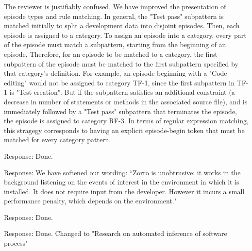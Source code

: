 \documentclass[11pt]{article}
\begin{document}
\noindent The reviewer is justifiably confused.  We have improved the
presentation of episode types and rule matching. In general, the "Test pass" subpattern is matched initially
to split a development data into disjoint episodes. Then, each episode is
assigned to a category. To assign an episode into a category, every part of
the episode must match a subpattern, starting from the beginning of an
episode. Therefore, for an episode to be matched to a category, the first
subpattern of the episode must be matched to the first subpattern specified
by that category's definition. For example, an episode beginning with a
"Code editing" would not be assigned to category TF-1, since the first
subpattern in TF-1 is "Test creation". But if the subpattern satisfies an
additional constraint (a decrease in number of statements or methods in the
associated source file), and is immediately followed by a "Test pass"
subpattern that terminates the episode, the episode is assigned to category
RF-3. In terms of regular expression matching, this stragegy corresponds to
having an explicit episode-begin token that must be matched for every
category pattern.


\noindent Response: Done.


\noindent Response: We have softened our wording: ``Zorro is unobtrusive:  
it works in the background listening on the events of interest in the environment 
in which it is installed. It does not require input from the developer. 
However it incurs a small performance penalty, which depends on the environment." 



\noindent Response: Done. 


\noindent Response: Done. Changed to "Research on automated inference of software process"
\end{document}
